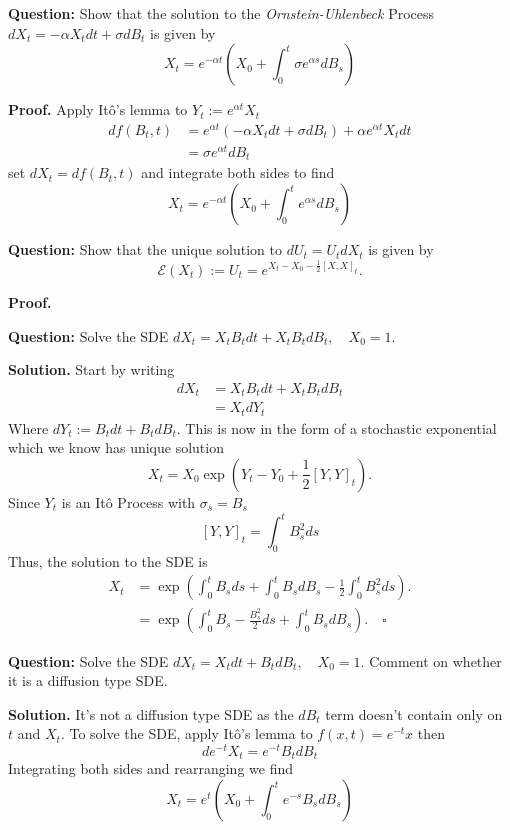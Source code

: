 \documentclass{article}
\begin{document}
\begin{tcolorbox}[colframe=black,colback=gray!5,boxrule=0.5pt]
\textbf{Question:} Show that the solution to the \textit{Ornstein-Uhlenbeck} Process $dX_t = -\alpha X_tdt + \sigma dB_t$ is given by 
$$X_t = e^{-\alpha t}\left(X_0 + \int_0^t\sigma e^{\alpha s}dB_s\right)$$
\end{tcolorbox}
\textbf{Proof.} Apply Itô's lemma to $Y_t := e^{\alpha t} X_t$ 
\begin{align*}
    df(B_t, t) &= e^{\alpha t}(-\alpha X_tdt + \sigma dB_t) + \alpha e^{\alpha t}X_t dt \\
               &= \sigma e^{\alpha t} dB_t
\end{align*}
set $dX_t = df(B_t,t)$ and integrate both sides to find 
$$X_t = e^{-\alpha t}\left(X_0 + \int_0^t e^{\alpha s}dB_s\right)$$

\begin{tcolorbox}[colframe=black,colback=gray!5,boxrule=0.5pt]
\textbf{Question:} Show that the unique solution to $dU_t = U_tdX_t$ is given by 
$$\mathcal{E}(X_t) := U_t = e^{X_t - X_0 - \frac{1}{2}[X,X]_t}.$$
\end{tcolorbox}
\textbf{Proof.}

\begin{tcolorbox}[colframe=black,colback=gray!5,boxrule=0.5pt]
\textbf{Question:} Solve the SDE $dX_t = X_tB_tdt + X_tB_tdB_t, \quad X_0=1$.
\end{tcolorbox}
\textbf{Solution.} Start by writing
\begin{align*}
    dX_t &= X_tB_tdt + X_tB_tdB_t \\
    &= X_tdY_t
\end{align*}
Where $dY_t := B_tdt + B_tdB_t$. This is now in the form of a stochastic exponential which we know has unique solution
$$X_t = X_0\exp\left(Y_t - Y_0 + \frac{1}{2}[Y,Y]_t\right).$$
Since $Y_t$ is an Itô Process with $\sigma_s = B_s$
$$[Y,Y]_t = \int_0^t B_s^2 ds$$
Thus, the solution to the SDE is 
\begin{align*}
    X_t &= \exp\left( \int_0^tB_sds + \int_0^t B_sdB_s - \frac{1}{2}\int_0^t B_s^2ds\right). \\
    &= \exp\left( \int_0^tB_s - \frac{B_s^2}{2}ds + \int_0^t B_sdB_s \right). \quad \square
\end{align*}

\begin{tcolorbox}[colframe=black,colback=gray!5,boxrule=0.5pt]
\textbf{Question:} Solve the SDE $dX_t = X_t dt + B_tdB_t, \quad X_0=1$. Comment on whether it is a diffusion type SDE. 
\end{tcolorbox}
\textbf{Solution.} It's not a diffusion type SDE as the $dB_t$ term doesn't contain only on $t$ and $X_t$. To solve the SDE, apply Itô's lemma to $f(x,t) = e^{-t}x$ then 
$$de^{-t}X_t = e^{-t}B_tdB_t$$
Integrating both sides and rearranging we find 
$$X_t = e^t\left(X_0 + \int_0^te^{-s}B_sdB_s\right)$$
\end{document}
